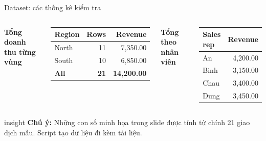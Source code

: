 \documentclass[aspectratio=169,11pt]{beamer}
\begin{document}
\begin{frame}[fragile]{Dataset: các thống kê kiểm tra}

\begin{columns}[T,onlytextwidth]
\textbf{Tổng doanh thu từng vùng}
\begin{center}
\renewcommand{\arraystretch}{1.18}
\begin{tabular}{lrr}
\toprule
Region & Rows & Revenue \\
\midrule
North & 11 & 7,350.00 \\
South & 10 & 6,850.00 \\
\textbf{All} & \textbf{21} & \textbf{14,200.00} \\
\bottomrule
\end{tabular}
\end{center}
\textbf{Tổng theo nhân viên}
\begin{center}
\renewcommand{\arraystretch}{1.18}
\begin{tabular}{lr}
\toprule
Sales rep & Revenue \\
\midrule
An & 4,200.00 \\
Binh & 3,150.00 \\
Chau & 3,400.00 \\
Dung & 3,450.00 \\
\bottomrule
\end{tabular}
\end{center}
\end{columns}
\par\vspace{0.3em}
\begin{beamercolorbox}[wd=\linewidth,sep=1.1ex,rounded=true]{insight}
\textbf{Chú ý:} Những con số minh họa trong slide được tính từ chính 21 giao dịch mẫu. Script tạo dữ liệu đi kèm tài liệu.
\end{beamercolorbox}
\end{frame}
\end{document}
